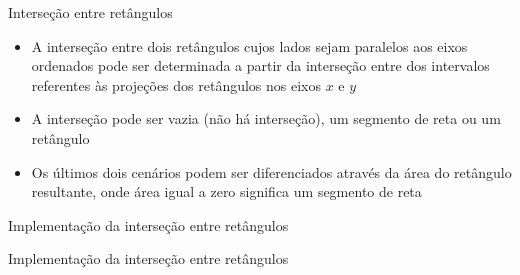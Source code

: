 \begin{frame}[fragile]{Interseção entre retângulos}

    \begin{itemize}
        \item A interseção entre dois retângulos cujos lados sejam paralelos aos eixos ordenados pode ser determinada a partir da 
            interseção entre dos intervalos referentes às projeções dos retângulos nos eixos 
            $x$ e $y$
        \pause

        \item A interseção pode ser vazia (não há interseção), um segmento de reta ou um retângulo
        \pause

        \item Os últimos dois cenários podem ser diferenciados através da área do retângulo 
            resultante, onde área igual a zero significa um segmento de reta
    \end{itemize}
        \pause

    \begin{figure}
        \centering

    \end{figure}
\end{frame}

\begin{frame}[fragile]{Implementação da interseção entre retângulos}
\end{frame}

\begin{frame}[fragile]{Implementação da interseção entre retângulos}
\end{frame}
